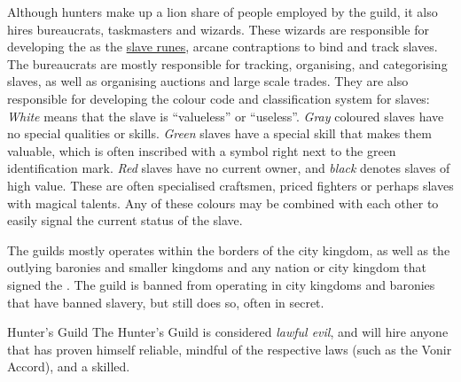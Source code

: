 Although hunters make up a lion share of people employed by the guild, it also
hires bureaucrats, taskmasters and wizards. These wizards are responsible for
developing the  as the \hyperref[sec:Slave Mark]{slave
  runes}, arcane contraptions to bind and track slaves. The bureaucrats are
mostly responsible for tracking, organising, and categorising slaves, as well
as organising auctions and large scale trades. They are also responsible for
developing the colour code and classification system for slaves: \emph{White}
means that the slave is ``valueless'' or ``useless''. \emph{Gray} coloured
slaves have no special qualities or skills. \emph{Green} slaves have a special
skill that makes them valuable, which is often inscribed with a symbol right
next to the green identification mark. \emph{Red} slaves have no current
owner, and \emph{black} denotes slaves of high value. These are often
specialised craftsmen, priced fighters or perhaps slaves with magical
talents. Any of these colours may be combined with each other to easily signal
the current status of the slave.

The guilds mostly operates within the borders of the city kingdom, as well as
the outlying baronies and smaller kingdoms and any nation or city kingdom
that signed the . The guild is banned from operating
in city kingdoms and baronies that have banned slavery, but still does so, often
in secret.

\begin{35e}{Hunter's Guild}
  The Hunter's Guild is considered \emph{lawful evil}, and will hire anyone that
  has proven himself reliable, mindful of the respective laws (such as the Vonir
  Accord), and a skilled.
\end{35e}
